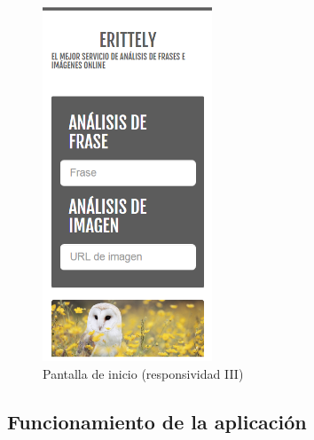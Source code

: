 \documentclass[a4paper]{article}
\begin{document}
\begin{figure}[htp!]
    \centering
    \caption{Pantalla de inicio (responsividad III)}
    \label{fig:3}
    \includegraphics[width=0.45\textwidth]{3}
\end{figure}
\newpage
\clearpage
\subsection{Funcionamiento de la aplicación} %
\label{sub:funcionamiento_de_la_aplicación}
\end{document}
